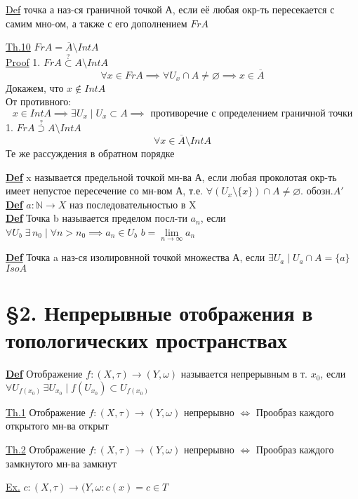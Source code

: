 \documentclass[a4paper]{article}
\begin{document}
\underline{Def} точка а наз-ся граничной точкой А, если её любая окр-ть пересекается
с самим мно-ом, а также с его дополнением $ FrA $ 

\begin{tcolorbox}
    \underline{Th.10} $ FrA = \overline{A} \setminus IntA $  \\

    \underline{Proof} 1. $ FrA \stackrel{?}{\subset} A \setminus IntA $  \\
    \[
        \forall x \in FrA \implies \forall U_x \cap A \neq \varnothing \implies
        x\in \overline{A}
    \]
    Докажем, что $ x \notin IntA $ \\
    От противного:
    \[
        x\in IntA \implies \exists U_x \; | \; U_x \subset A \implies
        \text{ противоречие с определением граничной точки}
    \]
1. $ FrA \stackrel{?}{\supset} A \setminus IntA $
\[
    \forall x \in \overline{A} \setminus IntA
\]
Те же рассуждения в обратном порядке
\end{tcolorbox}

\textbf{\underline{Def}} x называется предельной точкой мн-ва А, если любая
проколотая окр-ть имеет непустое пересечение со мн-вом А, т.е.  
$ \forall(U_x \setminus \{x\}) \cap A \neq \varnothing $. обозн.$ A' $ \\

\textbf{\underline{Def}} $ a: \mathbb{N} \to X $ наз последовательностью в X\\

\textbf{\underline{Def}}  Точка b называется пределом посл-ти $ a_n $, если
$ \forall U_b \; \exists \, n_0 \; | \;  \forall n > n_0 \implies 
a_n \in U_b $  $ b = \lim\limits_{n \to \infty}a_n  $ 

\textbf{\underline{Def}} Точка a наз-ся изолировнной точкой множества А, если
$ \exists U_a \; | \; U_a \cap A = \{a\} $  $ Iso A $

\section*{\centering\S2. Непрерывные отображения в топологических пространствах}
\textbf{\underline{Def}} Отображение $ f: (X, \tau) \to (Y, \omega)  $ называется
непрерывным в т. $ x_0 $, если $ \forall U_{f(x_0)} \, \exists U_{x_0} \; | \;
f(U_{x_0}) \subset U_{f(x_0)}$ 

\begin{tcolorbox}
    \underline{Th.1} Отображение $ f: (X, \tau) \to (Y, \omega) \text{ непрерывно }
    \iff $ Прообраз каждого открытого мн-ва открыт
    
    \underline{Th.2} Отображение $ f: (X, \tau) \to (Y, \omega)\text{ непрерывно }
    \iff $ Прообраз
    каждого замкнутого мн-ва замкнут
\end{tcolorbox}

\underline{Ex.} $ c: (X, \tau) \to (Y, \omega : c(x) = c \in T $ 
\end{document}
